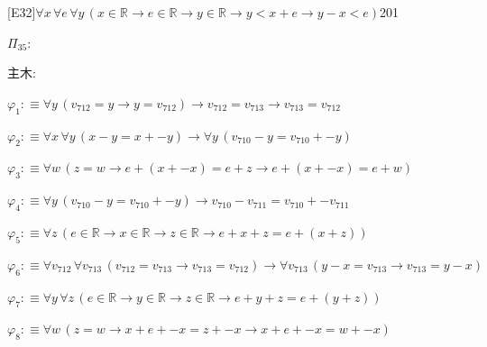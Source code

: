 \begin{fullproof}{[E32]}{$\forall x\,\forall e\,\forall y\,(x \in \mathbb{R} \to e \in \mathbb{R} \to y \in \mathbb{R} \to y < x + e \to y - x < e)$}{201}
\begin{ptree}
\end{ptree}
\noindent$\Pi_{35}$:
\begin{ptree}
\noLine
{}
\noLine
{}
\noLine
{}
\end{ptree}
\noindent 主木:
\begin{ptree}
\noLine
{}
\end{ptree}
\begin{abbrevlist}
\item $\varphi_{1} :\equiv \forall y\,(v_{712} = y \to y = v_{712}) \to v_{712} = v_{713} \to v_{713} = v_{712}$
\item $\varphi_{2} :\equiv \forall x\,\forall y\,(x - y = x + -y) \to \forall y\,(v_{710} - y = v_{710} + -y)$
\item $\varphi_{3} :\equiv \forall w\,(z = w \to e + (x + -x) = e + z \to e + (x + -x) = e + w)$
\item $\varphi_{4} :\equiv \forall y\,(v_{710} - y = v_{710} + -y) \to v_{710} - v_{711} = v_{710} + -v_{711}$
\item $\varphi_{5} :\equiv \forall z\,(e \in \mathbb{R} \to x \in \mathbb{R} \to z \in \mathbb{R} \to e + x + z = e + (x + z))$
\item $\varphi_{6} :\equiv \forall v_{712}\,\forall v_{713}\,(v_{712} = v_{713} \to v_{713} = v_{712}) \to \forall v_{713}\,(y - x = v_{713} \to v_{713} = y - x)$
\item $\varphi_{7} :\equiv \forall y\,\forall z\,(e \in \mathbb{R} \to y \in \mathbb{R} \to z \in \mathbb{R} \to e + y + z = e + (y + z))$
\item $\varphi_{8} :\equiv \forall w\,(z = w \to x + e + -x = z + -x \to x + e + -x = w + -x)$

\end{abbrevlist}
\end{fullproof}
